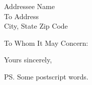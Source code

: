\documentclass[11pt]{letter}
\date{\today}
\begin{document}
\begin{letter}{Addressee Name \\ To Address \\ City, State Zip Code}

    \opening{To Whom It May Concern:}

    \kant[1-3]

    \closing{Yours sincerely,}



    \ps{Some postscript words.}

\end{letter}
\end{document}
